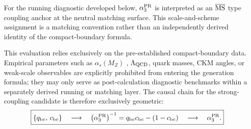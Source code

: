 \documentclass[11pt]{article}
\begin{document}
For the running diagnostic developed below, $\alpha_3^{\rm PR}$ is interpreted as an $\overline{\rm MS}$ type coupling anchor at the neutral matching surface. This scale-and-scheme assignment is a matching convention rather than an independently derived identity of the compact-boundary formula.

This evaluation relies exclusively on the pre-established compact-boundary data. Empirical parameters such as \(\alpha_s(M_Z)\) \cite{GrossWilczek1973}, \(\Lambda_{\rm QCD}\), quark masses, CKM angles, or weak-scale observables are explicitly prohibited from entering the generation formula; they may only serve as post-calculation diagnostic benchmarks within a separately derived running or matching layer. The causal chain for the strong-coupling candidate is therefore exclusively geometric:
\begin{equation}
\boxed{
\left\{
q_{\rm bc},\,c_{\rm bc}
\right\}
\quad\longrightarrow\quad
\left(
\alpha_3^{\rm PR}
\right)^{-1}
=
q_{\rm bc}c_{\rm bc}-(1-c_{\rm bc})
\quad\longrightarrow\quad
\alpha_3^{\rm PR}.
}
\end{equation}
\end{document}
